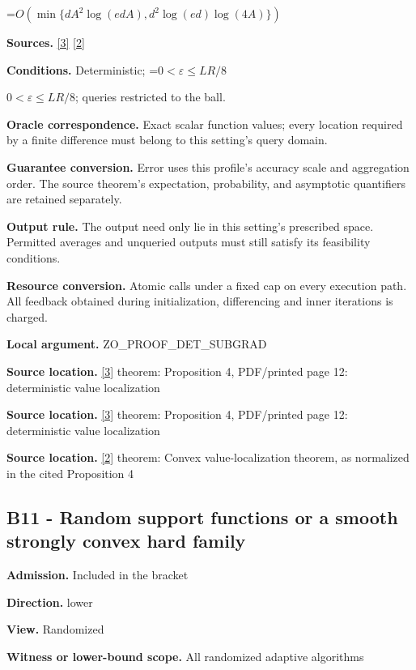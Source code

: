 \documentclass[10pt,a4paper]{article}
\newcommand{\AtlasMath}[1]{\par\begingroup\centering\setbox0=\hbox{$\displaystyle #1$}\ifdim\wd0>1.4\linewidth\typeout{ATLAS WIDE FORMULA: \the\wd0}\fi\ifdim\wd0>\linewidth\resizebox{\linewidth}{!}{\box0}\else\box0\fi\par\endgroup}
\newcommand{\AtlasInlineMath}[1]{\begingroup\setbox0=\hbox{$#1$}\ifdim\wd0>.4\linewidth\endgroup\AtlasMath{#1}\else\endgroup$#1$\fi}
\begin{document}
\AtlasMath{O\!\left(\min\{dA^2\log(edA),d^2\log(ed)\log(4A)\}\right)}
\textbf{Sources.} \href{https://arxiv.org/html/2607.16558v2}{[3]} \href{https://www.mathnet.ru/php/archive.phtml?jrnid=mzm&option_lang=eng&paperid=1697&wshow=paper}{[2]}

\textbf{Conditions.} Deterministic; \AtlasInlineMath{0<\varepsilon\le LR/8}; queries restricted to the ball.

\textbf{Oracle correspondence.} Exact scalar function values; every location required by a finite difference must belong to this setting's query domain.

\textbf{Guarantee conversion.} Error uses this profile's accuracy scale and aggregation order. The source theorem's expectation, probability, and asymptotic quantifiers are retained separately.

\textbf{Output rule.} The output need only lie in this setting's prescribed space. Permitted averages and unqueried outputs must still satisfy its feasibility conditions.

\textbf{Resource conversion.} Atomic calls under a fixed cap on every execution path. All feedback obtained during initialization, differencing and inner iterations is charged.

\textbf{Local argument.} ZO\_\allowbreak{}PROOF\_\allowbreak{}DET\_\allowbreak{}SUBGRAD

\textbf{Source location.} \href{https://arxiv.org/html/2607.16558v2}{[3]} theorem: Proposition 4, PDF/printed page 12: deterministic value localization

\textbf{Source location.} \href{https://arxiv.org/html/2607.16558v2}{[3]} theorem: Proposition 4, PDF/printed page 12: deterministic value localization

\textbf{Source location.} \href{https://www.mathnet.ru/php/archive.phtml?jrnid=mzm&option_lang=eng&paperid=1697&wshow=paper}{[2]} theorem: Convex value-localization theorem, as normalized in the cited Proposition 4

\subsection{B11 - Random support functions or a smooth strongly convex hard family}
\textbf{Admission.} Included in the bracket

\textbf{Direction.} lower

\textbf{View.} Randomized

\textbf{Witness or lower-bound scope.} All randomized adaptive algorithms
\end{document}

